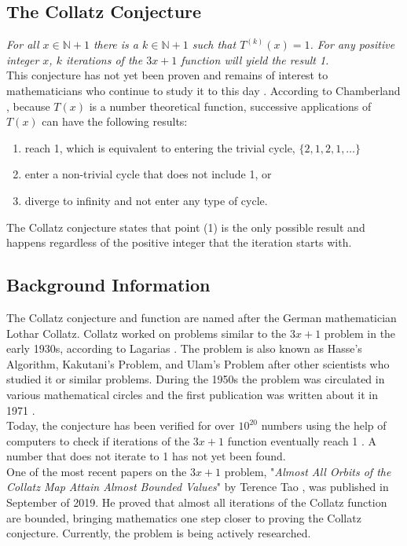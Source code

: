 \documentclass[12pt,a4paper,reqno]{amsart}
\begin{document}
\subsection{The Collatz Conjecture}

\textit{For all $x \in \mathbb{N} + 1$ there is a $k \in \mathbb{N} + 1$ such 
that $T^{(k)}(x)=1$. For any positive integer $x$, $k$ iterations of the $3x+1$ 
function will yield the result 1.} \\
This conjecture has not yet been proven and remains of interest to
mathematicians who continue to study it to this day \cite{src:03}. According to 
Chamberland \cite{src:02}, because $T(x)$ is a number theoretical function, 
successive applications of $T(x)$ can have the following results:
\begin{enumerate}
    \item reach 1, which is equivalent to entering the trivial cycle,
        $\{2,1,2,1,\dots\}$
    \item enter a non-trivial cycle that does not include 1, or
    \item diverge to infinity and not enter any type of cycle.
\end{enumerate}
The Collatz conjecture states that point (1) is the only possible result and 
happens regardless of the positive integer that the iteration starts with.

\subsection{Background Information}

The Collatz conjecture and function are named after the German mathematician
Lothar Collatz. Collatz worked on problems similar to the $3x+1$ problem in the
early 1930s, according to Lagarias \cite{src:03}. The problem is also known as 
Hasse's Algorithm, Kakutani's Problem, and Ulam's Problem 
after other scientists who studied it or similar problems. During the 1950s 
the problem was circulated in various mathematical circles and the first 
publication was written about it in 1971 \cite{src:03}. \\
Today, the conjecture has been verified for over $10^{20}$ numbers using the 
help of computers to check if iterations of the $3x+1$ function eventually
reach 1 \cite{src:04}. A number that does not iterate to 1 has not yet been
found. \\
One of the most recent papers on the $3x+1$ problem, "\textit{Almost All Orbits
of the Collatz Map Attain Almost Bounded Values}" by Terence Tao \cite{src:04},
was published in September of 2019. He proved that almost all iterations of the
Collatz function are bounded, bringing mathematics one step closer to proving 
the Collatz conjecture. Currently, the problem is being actively researched.
\end{document}

